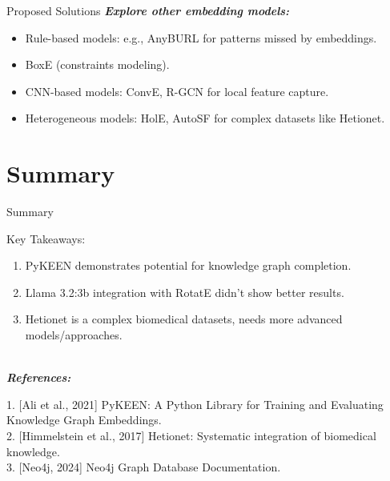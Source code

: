 \documentclass{beamer}
\begin{document}
\begin{frame}{Proposed Solutions}
    \textbf{\textit{Explore other embedding models:}}

    \begin{itemize}
        \item Rule-based models: e.g., AnyBURL for patterns missed by embeddings.
        \item BoxE (constraints modeling).
        \item CNN-based models: ConvE, R-GCN for local feature capture.
        \item Heterogeneous models: HolE, AutoSF for complex datasets like Hetionet.
    \end{itemize}

\end{frame}

\section{Summary}
\begin{frame}{Summary}

    \begin{alertblock}{Key Takeaways:}
        \begin{enumerate}

            \item \small PyKEEN demonstrates potential for knowledge graph completion.

            \item \small Llama 3.2:3b integration with RotatE didn't show better results.

            \item \small Hetionet is a complex biomedical datasets, needs more advanced models/approaches.

        \end{enumerate}
    \end{alertblock}

    \textbf{\textit{\\References:}}

    \small 1. [Ali et al., 2021] PyKEEN: A Python Library for Training and Evaluating Knowledge Graph Embeddings.\\

    \small 2. [Himmelstein et al., 2017] Hetionet: Systematic integration of biomedical knowledge.\\

    \small 3. [Neo4j, 2024] Neo4j Graph Database Documentation.

\end{frame}
\end{document}
